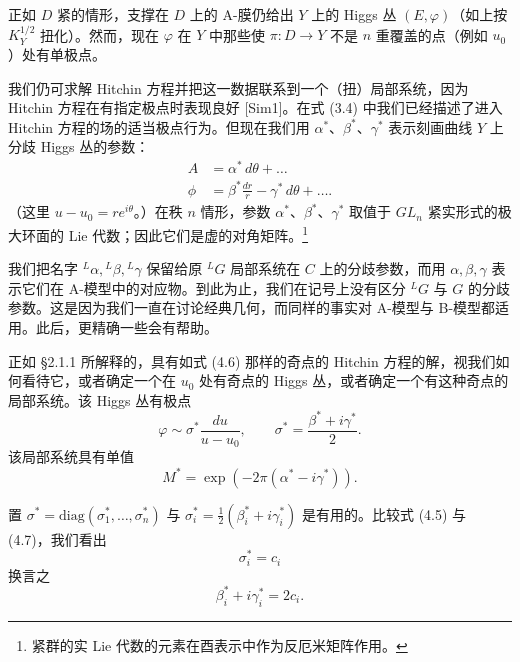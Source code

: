 \documentclass[11pt,a4paper]{article}
\begin{document}
正如 $D$ 紧的情形，支撑在 $D$ 上的 A-膜仍给出 $Y$ 上的 Higgs 丛 $(E,\varphi)$（如上按 $K_Y^{1/2}$ 扭化）。然而，现在 $\varphi$ 在 $Y$ 中那些使 $\pi:D\to Y$ 不是 $n$ 重覆盖的点（例如 $u_0$）处有单极点。

我们仍可求解 Hitchin 方程并把这一数据联系到一个（扭）局部系统，因为 Hitchin 方程在有指定极点时表现良好 [Sim1]。在式 (3.4) 中我们已经描述了进入 Hitchin 方程的场的适当极点行为。但现在我们用 $\alpha^*$、$\beta^*$、$\gamma^*$ 表示刻画曲线 $Y$ 上分歧 Higgs 丛的参数：
\begin{equation}\tag{4.6}
\begin{aligned}
A&=\alpha^*\,d\theta+\dots\\
\phi&=\beta^*\frac{dr}{r}-\gamma^*\,d\theta+\dots.
\end{aligned}
\end{equation}
（这里 $u-u_0=re^{i\theta}$。）在秩 $n$ 情形，参数 $\alpha^*$、$\beta^*$、$\gamma^*$ 取值于 $GL_n$ 紧实形式的极大环面的 Lie 代数；因此它们是虚的对角矩阵。\footnote{紧群的实 Lie 代数的元素在酉表示中作为反厄米矩阵作用。}


我们把名字 ${}^L\alpha,{}^L\beta,{}^L\gamma$ 保留给原 ${}^LG$ 局部系统在 $C$ 上的分歧参数，而用 $\alpha,\beta,\gamma$ 表示它们在 A-模型中的对应物。到此为止，我们在记号上没有区分 ${}^LG$ 与 $G$ 的分歧参数。这是因为我们一直在讨论经典几何，而同样的事实对 A-模型与 B-模型都适用。此后，更精确一些会有帮助。

正如 §2.1.1 所解释的，具有如式 (4.6) 那样的奇点的 Hitchin 方程的解，视我们如何看待它，或者确定一个在 $u_0$ 处有奇点的 Higgs 丛，或者确定一个有这种奇点的局部系统。该 Higgs 丛有极点
\begin{equation}\tag{4.7}
\varphi\sim\sigma^*\frac{du}{u-u_0},\qquad \sigma^*=\frac{\beta^*+i\gamma^*}{2}.
\end{equation}
该局部系统具有单值
\begin{equation}\tag{4.8}
M^*=\exp(-2\pi(\alpha^*-i\gamma^*)).
\end{equation}

置 $\sigma^*=\mathrm{diag}(\sigma_1^*,\dots,\sigma_n^*)$ 与 $\sigma_i^*=\frac{1}{2}(\beta_i^*+i\gamma_i^*)$ 是有用的。比较式 (4.5) 与 (4.7)，我们看出
\begin{equation}\tag{4.9}
\sigma_i^*=c_i
\end{equation}
换言之
\begin{equation}\tag{4.10}
\beta_i^*+i\gamma_i^*=2c_i.
\end{equation}
\end{document}
